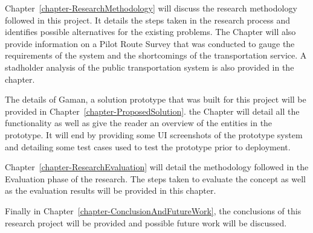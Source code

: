 Chapter~\ref{chapter-ResearchMethodology} will discuss the research methodology followed in this project. It details the steps taken in the research process and identifies possible alternatives for the existing problems. The Chapter will also provide information on a Pilot Route Survey that was conducted to gauge the requirements of the system and the shortcomings of the transportation service. A stadholder analysis of the public transportation system is also provided in the chapter.

The details of Gaman, a solution prototype that was built for this project will be provided in Chapter~\ref{chapter-ProposedSolution}. the Chapter will detail all the functionality as well as give the reader an overview of the entities in the prototype. It will end by providing some UI screenshots of the prototype system and detailing some test cases used to test the prototype prior to deployment.

Chapter~\ref{chapter-ResearchEvaluation} will detail the methodology followed in the Evaluation phase of the research. The steps taken to evaluate the concept as well as the evaluation results will be provided in this chapter.

Finally in Chapter~\ref{chapter-ConclusionAndFutureWork}, the conclusions of this research project will be provided and possible future work will be discussed.


